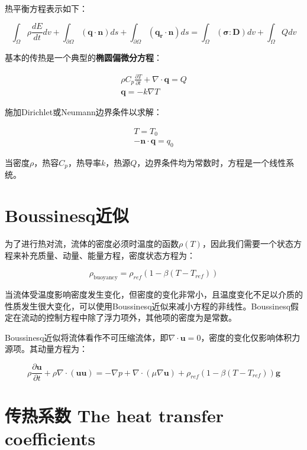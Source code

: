 热平衡方程表示如下：

\begin{equation}
    \int_{\Omega} \rho \frac{dE}{dt} dv + \int_{\partial\Omega} (\bm{q\cdot n}) ds + \int_{\partial\Omega} (\bm{q_r\cdot n}) ds = \int_{\Omega} (\bm{\sigma:D}) dv + \int_{\Omega} Q dv
\end{equation}

基本的传热是一个典型的\textbf{椭圆偏微分方程}：

\begin{gather}
    \rho C_p \frac{\partial T}{\partial t} + \nabla\cdot \bm{q} = Q \\
    \bm{q} = -k \nabla T
\end{gather}

施加Dirichlet或Neumann边界条件以求解：

\begin{gather}
    T = T_0\\
    -\bm{n\cdot q} = q_0
\end{gather}

当密度$\rho$，热容$C_p$，热导率$k$，热源$Q$，边界条件均为常数时，方程是一个线性系统。

\section{Boussinesq近似}
为了进行热对流，流体的密度必须时温度的函数$ \rho(T) $，因此我们需要一个状态方程来补充质量、动量、能量方程，密度状态方程为：

\begin{equation}
\rho_{\text{buoyancy}} = \rho_{ref}(1-\beta(T-T_{ref}))
\end{equation}

当流体受温度影响密度发生变化，但密度的变化非常小，且温度变化不足以介质的性质发生很大变化，可以使用Boussinesq近似来减小方程的非线性。Boussinesq假定在流动的控制方程中除了浮力项外，其他项的密度为是常数。

Boussinesq近似将流体看作不可压缩流体，即$ \nabla\cdot\bm{u} = 0 $，密度的变化仅影响体积力源项。其动量方程为：

\begin{equation}
\rho \frac{\partial \bm{u}}{\partial t} + \rho\nabla\cdot(\bm{uu}) = -\nabla p + \nabla\cdot(\mu\nabla\bm{u}) + \rho_{ref}(1-\beta(T-T_{ref}))\bm{g}
\end{equation}

\section{传热系数 The heat transfer coefficients}

